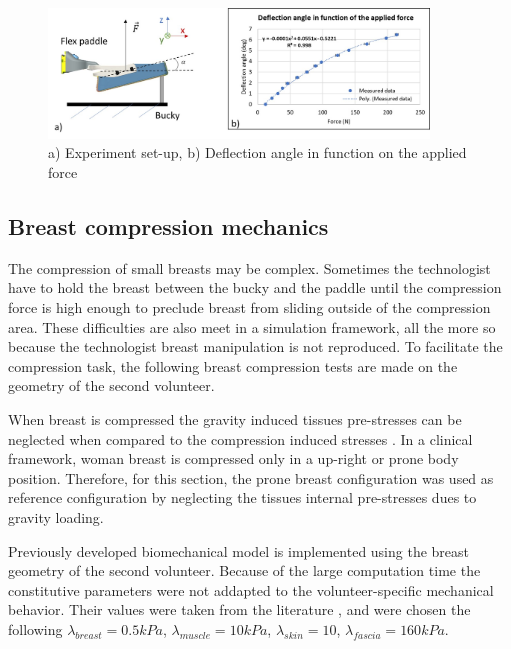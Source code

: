 \begin{figure}[!h]
\centering
\includegraphics[width=0.9\textwidth,keepaspectratio]{figures/deflectionAngle.jpg} 
\caption{ a) Experiment set-up, b) Deflection angle in function on the applied force }\label{fig:deflectionangle}
\end{figure}

 
\subsection{Breast compression mechanics}

The compression of small breasts may be complex. Sometimes the technologist have to hold the breast between the bucky and the  paddle until the compression force is high enough to preclude breast from sliding outside of the compression area. These difficulties are also meet in a simulation framework, all the more so because the technologist breast manipulation is not reproduced. To facilitate the compression task, the following breast compression tests are made on the geometry of the second volunteer.

When breast is compressed the gravity induced tissues pre-stresses can be neglected when compared to the compression induced stresses \citep{han_development_2012, ruiter_model_based_2006, sturgeon_finite_element_2016}. In a clinical framework, woman breast is compressed only in a up-right or prone body position. Therefore, for this section, the prone breast configuration was used as reference configuration by neglecting the tissues internal pre-stresses dues to gravity loading.

Previously developed biomechanical model is implemented  using the breast geometry of the second volunteer. Because of the large computation time the constitutive parameters were not addapted to the volunteer-specific mechanical behavior. Their values were taken from the literature \citep{han_nonlinear_2014,rajagopal_modelling_2007,gefen_mechanics_2007}, and were chosen the following $\lambda_{breast}=0.5 kPa$, $\lambda_{muscle}= 10kPa$, $\lambda_{skin}=10$, $\lambda_{fascia}= 160kPa$.    

